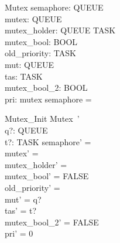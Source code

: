 \begin{schema}{Mutex}
    semaphore: \power QUEUE\\
    mutex: \power QUEUE\\
    mutex\_holder: QUEUE \pfun TASK\\
    mutex\_bool: BOOL\\
    old\_priority: TASK \pfun \nat\\
    mut: QUEUE\\
    tas: TASK\\
    mutex\_bool\_2: BOOL\\
    pri: \nat
\where
    mutex \cap semaphore = \emptyset\\
\end{schema}

\begin{schema}{Mutex\_Init}
    Mutex~'\\
    q?: QUEUE \\
    t?: TASK
\where
    semaphore' = \emptyset\\
    mutex' = \emptyset\\
    mutex\_holder' = \emptyset\\
    mutex\_bool' = FALSE\\
    old\_priority' = \emptyset\\
    mut' = q?\\
    tas' = t?\\
    mutex\_bool\_2' = FALSE\\
    pri' = 0
\end{schema}

